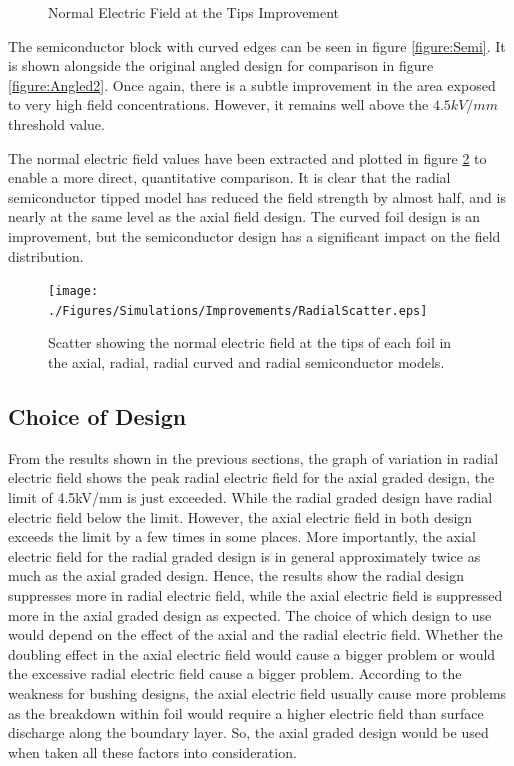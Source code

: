 \begin{figure}[!h]
\centering
{}
\caption{Normal Electric Field at the Tips Improvement}
\label{figure:semicompare}
\end{figure}

The semiconductor block with curved edges can be seen in figure \ref{figure:Semi}.
It is shown alongside the original angled design for comparison in figure \ref{figure:Angled2}.
Once again, there is a subtle improvement in the area exposed to very high field concentrations.
However, it remains well above the $4.5kV/mm$ threshold value.

The normal electric field values have been extracted and plotted in figure \ref{figure:scattercomp} to enable a more direct, quantitative comparison.
It is clear that the radial semiconductor tipped model has reduced the field strength by almost half, and is nearly at the same level as the axial field design.
The curved foil design is an improvement, but the semiconductor design has a significant impact on the field distribution.

\begin{figure}[!h]
\centering
\texttt{[image: ./Figures/Simulations/Improvements/RadialScatter.eps]}
\caption{Scatter showing the normal electric field at the tips of each foil in the axial, radial, radial curved and radial semiconductor models.}
\label{figure:scattercomp}
\end{figure}


\subsection{Choice of Design}
From the results shown in the previous sections, the graph of variation in radial electric field shows the peak radial electric field for the axial graded design, the limit of 4.5kV/mm is just exceeded. While the radial graded design have radial electric field below the limit. However, the axial electric field in both design exceeds the limit by a few times in some places. More importantly, the axial electric field for the radial graded design is in general approximately twice as much as the axial graded design. Hence, the results show the radial design suppresses more in radial electric field, while the axial electric field is suppressed more in the axial graded design as expected. The choice of which design to use would depend on the effect of the axial and the radial electric field. Whether the doubling effect in the axial electric field would cause a bigger problem or would the excessive radial electric field cause a bigger problem. According to the weakness for bushing designs, the axial electric field usually cause more problems as the breakdown within foil would require a higher electric field than surface discharge along the boundary layer. So, the axial graded design would be used when taken all these factors into consideration.

